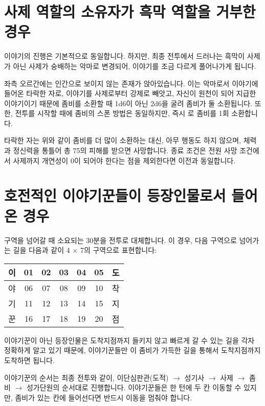 \documentclass{report}
\begin{document}
	\hypertarget{alternative:no-criminal}{}
	\section{사제 역할의 소유자가 흑막 역할을 거부한 경우}
		이야기의 진행은 기본적으로 동일합니다. 하지만, 최종 전투에서 드러나는 흑막이 사제가 아닌 사제가 숭배하는 악마로 변경되어, 이야기를 조금 다르게 풀어나가게 됩니다.
		
		좌측 오르간에는 인간으로 보이지 않는 존재가 앉아있습니다. 이는 악마로서 이야기에 들어온 타락한 자로,  이야기를 사제로부터 강제로 빼앗고, 자신이 원천이 되어 지급한 이야기이기 때문에 좀비를 소환할 때 1d6이 아닌 2d6을 굴려 좀비가 둘 소환됩니다. 또한, 전투를 시작할 때에 좀비의 스폰 방법은 동일하지만, 즉시 로 좀비를 1회 소환합니다.
		
		타락한 자는 위와 같이 좀비를 더 많이 소환하는 대신, 아무 행동도 하지 않으며, 체력과 정신력을 통틀어 총 75의 피해를 받으면 사망합니다. 종료 조건은 전원 사망 조건에서 사제까지 개연성이 0이 되어야 한다는 점을 제외한다면 이전과 동일합니다.
	
	\hypertarget{alternative:war-ready}{}
	\section{호전적인 이야기꾼들이 등장인물로서 들어온 경우}
		구역을 넘어갈 때 소요되는 30분을 전투로 대체합니다. 이 경우, 다음 구역으로 넘어가는 길을 다음과 같이 4 $\times$ 7의 구역으로 표현합니다:
		
		\begin{center}
			\begin{tabular}{|c|c|c|c|c|c|c|}
				\hline
				이 & 01 & 02 & 03 & 04 & 05 & 도 \\\hline
				야 & 06 & 07 & 08 & 09 & 10 & 착 \\\hline
				기 & 11 & 12 & 13 & 14 & 15 & 지 \\\hline
				꾼 & 16 & 17 & 18 & 19 & 20 & 점 \\\hline
			\end{tabular}
		\end{center}
		
		이야기꾼이 아닌 등장인물은 도착지점까지 들키지 않고 빠르게 갈 수 있는 길을 각자 정확하게 알고 있기 때문에, 이야기꾼들만 이 좀비가 가득한 길을 통해서 도착지점까지 도착하면 됩니다.
		
		이야기꾼의 순서는 최종 전투와 같이, 이단심판관(도적) $\rightarrow$ 성기사 $\rightarrow$ 사제 $\rightarrow$ 좀비 $\rightarrow$ 성가단원의 순서대로 진행합니다. 이야기꾼들은 한 턴에 두 칸 이동할 수 있지만, 좀비가 있는 칸에 들어선다면 반드시 이동을 멈춰야 합니다.
		
\end{document}
